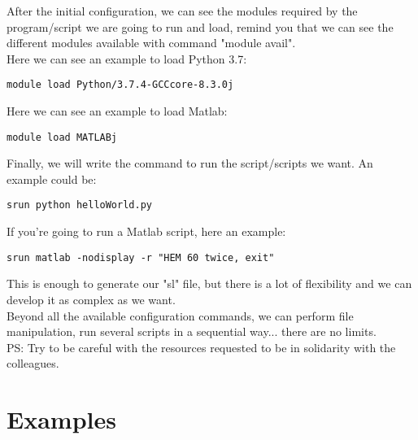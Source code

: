 \documentclass[a4paper]{article}
\begin{document}
		After the initial configuration, we can see the modules required by the program/script we are going to run and load, remind you that we can see the different modules available with command "module avail".\\ 
		Here we can see an example to load Python 3.7:\\
		\begin{lstlisting}[caption=Load module Python 3.7, label=lst:loadPython37]
			module load Python/3.7.4-GCCcore-8.3.0j
		\end{lstlisting}
		Here we can see an example to load Matlab:\\
		\begin{lstlisting}[caption=Load module MATLAB, label=lst:loadMatlab]
			module load MATLABj
		\end{lstlisting}
		Finally, we will write the command to run the script/scripts we want. An example could be:
		\begin{lstlisting}[caption=Run file Python, label=lst:runFilePython37]
			srun python helloWorld.py
		\end{lstlisting}
		If you're going to run a Matlab script, here an example:
		\begin{lstlisting}[caption=Run file Matlab, label=lst:runFileMatlab]
			srun matlab -nodisplay -r "HEM 60 twice, exit"
		\end{lstlisting}
		This is enough to generate our "sl" file, but there is a lot of flexibility and we can develop it as complex as we want.\\
		Beyond all the available configuration commands, we can perform file manipulation, run several scripts in a sequential way... there are no limits.\\
		PS: Try to be careful with the resources requested to be in solidarity with the colleagues.\\
	\section{Examples}
\end{document}
